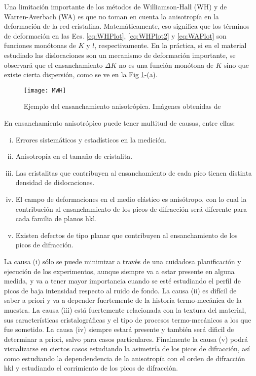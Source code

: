 Una limitación importante de los métodos de Williamson-Hall (WH) y de Warren-Averbach (WA) es que no toman en cuenta la anisotropía en la deformación de la red cristalina. 
Matemáticamente, eso significa que los términos de deformación en las Ecs. \ref{eq:WHPlot}, \ref{eq:WHPlot2} y \ref{eq:WAPlot} son funciones monótonas de $K$ y $l$, respectivamente.
En la práctica, si en el material estudiado las dislocaciones son un mecanismo de deformación importante, se observará que el ensanchamiento $\Delta K$ no es una función monótona de $K$ sino que existe cierta dispersión, como se ve en la Fig \ref{fig:MWH}-(a). 

\begin{figure}[!htb]
  \centering
  \texttt{[image: MWH]}
  \caption{Ejemplo del ensanchamiento anisotrópica. Imágenes obtenidas de \cite{Ungar1999}}
  \label{fig:MWH}
\end{figure}

En ensanchamiento anisotrópico puede tener multitud de causas, entre ellas:
\begin{enumerate}[(i)]
  \item Errores sistemáticos y estadísticos en la medición. 
  \item Anisotropía en el tamaño de cristalita.
  \item Las cristalitas que contribuyen al ensanchamiento de cada pico tienen distinta densidad de dislocaciones.
  \item El campo de deformaciones en el medio elástico es anisótropo, con lo cual la contribución al ensanchamiento de los picos de difracción será diferente para cada familia de planos {hkl}.
  \item Existen defectos de tipo planar que contribuyen al ensanchamiento de los picos de difracción.
\end{enumerate}

La causa (i) sólo se puede minimizar a través de una cuidadosa planificación y ejecución de los experimentos, aunque siempre va a estar presente en alguna medida, y va a tener mayor importancia cuando se esté estudiando el perfil de picos de baja intensidad respecto al ruido de fondo. 
La causa (ii) es difícil de saber a priori y va a depender fuertemente de la historia termo-mecánica de la muestra. 
La causa (iii) está fuertemente relacionada con la textura del material, sus características cristalográficas y el tipo de procesos termo-mecánicos a los que fue sometido. 
La causa (iv) siempre estará presente y también será dificil de determinar a priori, salvo para casos particulares.
Finalmente la causa (v) podrá visualizarse en ciertos casos estudiando la asimetría de los picos de difracción, así como estudiando la dependendencia de la anisotropía con el orden de difracción {hkl} y estudiando el corrimiento de los picos de difracción.

